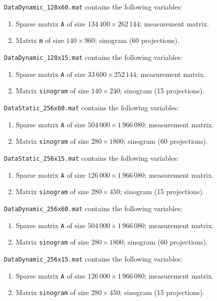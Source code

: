 \documentclass[a4paper,12pt]{article}
\begin{document}
{\bigskip\noindent
{\tt DataDynamic\_128x60.mat} contains the following variables:
\begin{enumerate}
\item Sparse matrix {\tt A} of size $134\,400\times 262\,144$; measurement matrix.
\item Matrix {\tt m} of size $140\times 960$; sinogram (60 projections).
\end{enumerate}

\bigskip\noindent
{\tt DataDynamic\_128x15.mat} contains the following variables:
\begin{enumerate}
\item Sparse matrix {\tt A} of size $33\,600\times 252\,144$; measurement matrix.
\item Matrix {\tt sinogram} of size $140\times 240$; sinogram (15 projections).
\end{enumerate}

\bigskip\noindent
{\tt DataStatic\_256x60.mat} contains the following variables:
\begin{enumerate}
\item Sparse matrix {\tt A} of size $504\,000\times 1\,966\,080$; measurement matrix.
\item Matrix {\tt sinogram} of size $280\times 1800$; sinogram (60 projections).
\end{enumerate}

\bigskip\noindent
{\tt DataStatic\_256x15.mat} contains the following variables:
\begin{enumerate}
\item Sparse matrix {\tt A} of size $126\,000\times 1\,966\,080$; measurement matrix.
\item Matrix {\tt sinogram} of size $280\times 450$; sinogram (15 projections).
\end{enumerate}

\bigskip\noindent
{\tt DataDynamic\_256x60.mat} contains the following variables:
\begin{enumerate}
\item Sparse matrix {\tt A} of size $504\,000\times 1\,966\,080$; measurement matrix.
\item Matrix {\tt sinogram} of size $280\times 1800$; sinogram (60 projections).
\end{enumerate}

\bigskip\noindent
{\tt DataDynamic\_256x15.mat} contains the following variables:
\begin{enumerate}
\item Sparse matrix {\tt A} of size $126\,000\times 1\,966\,080$; measurement matrix.
\item Matrix {\tt sinogram} of size $280\times 450$; sinogram (15 projections).
\end{enumerate}

}
\end{document}
